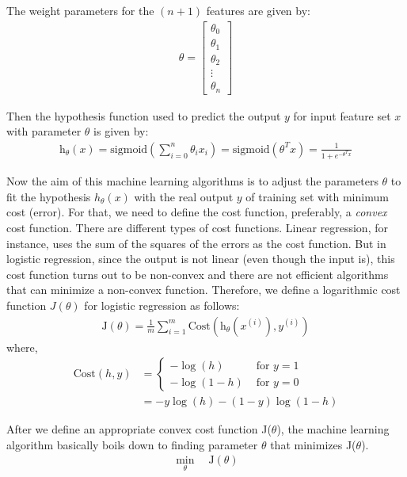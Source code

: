 The weight parameters for the $(n+1)$ features are given by:
\begin{align}
  \theta = 
  \begin{bmatrix}
    \theta_0 \\ \theta_1 \\ \theta_2 \\ \vdots \\ \theta_n
  \end{bmatrix}
  \nonumber
\end{align}

Then the hypothesis function used to predict the output $y$ for
input feature set $x$ with parameter $\theta$ is given by:
\begin{align}
  \text{h}_{\theta}(x) = 
  \text{sigmoid}\left( \sum_{i = 0}^{n} \theta_{i} x_{i}\right) =
  \text{sigmoid}\left( \theta^{T}x \right) =
  \frac{1}{1 + e^{-\theta^{T}x}}
  \label{eqn:hypothesis}
\end{align}

Now the aim of this machine learning algorithms is to adjust the parameters
$\theta$ to fit the hypothesis $h_{\theta}(x)$ with the real output $y$ of
training set with minimum cost (error). For that, we need to define the cost
function, preferably, a {\em convex} cost function. There are different types
of cost functions. Linear regression, for instance, uses the sum of the squares
of the errors as the cost function. But in logistic regression, since the output
is not linear (even though the input is), this cost function turns out to be
non-convex and there are not efficient algorithms that can minimize a non-convex
function. Therefore, we define a logarithmic cost function $J(\theta)$ for logistic regression
as follows:
\begin{align}
  \text{J}(\theta) = \frac{1}{m} \sum_{i=1}^{m}
  \text{Cost} \left( \text{h}_\theta \left(x^{(i)} \right), y^{(i)} \right)
  \label{eqn:j}
\end{align}
where,
\begin{align}
  \text{Cost} (h, y) &=
  \begin{cases}
    -\log (h) &\text{ for } y = 1 \\
    -\log (1-h) &\text{ for } y = 0
  \end{cases}
  \nonumber\\
  &= -y\log(h) - (1-y)\log(1-h)
  \label{eqn:cost}
\end{align}

After we define an appropriate convex cost function J($\theta$), the machine
learning algorithm basically boils down to finding parameter $\theta$
that minimizes J($\theta$).
\begin{align}
  \min_{\theta} \quad \text{J}(\theta)
\end{align}


